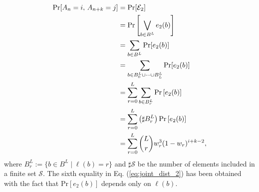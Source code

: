 \documentclass[dvipdfmx,english]{ampmt} %
\begin{document}
\begin{align}
\begin{split}\label{eq:joint_dist_2}
  \mathrm{Pr}[A_n=i ,\, A_{n+k}=j] &=
  \mathrm{Pr}[\mathcal{E}_2] \\
  &=\mathrm{Pr}\left[ \bigvee_{b \in B^L} e_2(b) \right] \\
  &= \sum_{b\in B^L} \mathrm{Pr} [e_2(b)] \\
  &= \sum_{b\in B_0^L \cup \dots \cup B_L^L} \mathrm{Pr} [e_2(b)] \\
  &= \sum_{r=0}^{L} \sum_{b\in B_{r}^L} \mathrm{Pr} \left[ e_2(b) \right] \\
  &= \sum_{r=0}^{L} \left(\sharp B_{r}^L \right) \mathrm{Pr} \left[ e_2(b) \right] \\
  &= \sum_{r=0}^{L} \dbinom{L}{r} w_{r}^3 (1-w_{r})^{i+k-2},
\end{split}
\end{align}
where $B_r^L := \{ b\in B^L \mid \ell(b)=r \}$ and $\sharp \mathcal{S}$ be the number of elements included in a finite set $\mathcal{S}$.
The sixth equality in Eq. (\ref{eq:joint_dist_2}) has been obtained with the fact that $\mathrm{Pr}[e_2(b)]$ depends only on $\ell (b)$.
%
\end{document}
